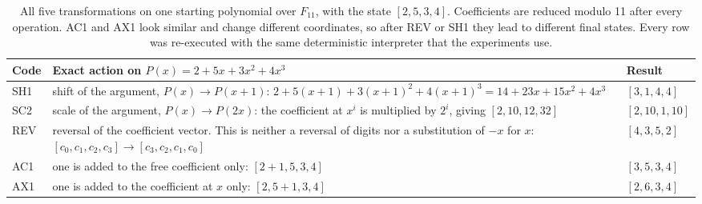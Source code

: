 \begin{table}[!tbh]
\centering\scriptsize\setlength{\tabcolsep}{4pt}
\begin{tabular}{|l|p{.50\linewidth}|l|}
\hline
\textbf{Code} & \textbf{Exact action on $P(x) = 2 + 5x + 3x^2 + 4x^3$} & \textbf{Result} \\
\hline
SH1 & shift of the argument, $P(x) \to P(x+1)$: $2 + 5(x+1) + 3(x+1)^2 + 4(x+1)^3 = 14 + 23x + 15x^2 + 4x^3$ & $[3, 1, 4, 4]$ \\ \hline
SC2 & scale of the argument, $P(x) \to P(2x)$: the coefficient at $x^i$ is multiplied by $2^i$, giving $[2, 10, 12, 32]$ & $[2, 10, 1, 10]$ \\ \hline
REV & reversal of the coefficient vector. This is neither a reversal of digits nor a substitution of $-x$ for $x$: $[c_0, c_1, c_2, c_3] \to [c_3, c_2, c_1, c_0]$ & $[4, 3, 5, 2]$ \\ \hline
AC1 & one is added to the free coefficient only: $[2+1, 5, 3, 4]$ & $[3, 5, 3, 4]$ \\ \hline
AX1 & one is added to the coefficient at $x$ only: $[2, 5+1, 3, 4]$ & $[2, 6, 3, 4]$ \\ \hline
\end{tabular}
\caption{All five transformations on one starting polynomial over $F_{11}$, with the
state $[2, 5, 3, 4]$. Coefficients are reduced modulo 11 after every operation. AC1
and AX1 look similar and change different coordinates, so after REV or
SH1 they lead to different final states. Every row was re-executed with the same
deterministic interpreter that the experiments use.}
\label{tab:opsexample}
\end{table}
